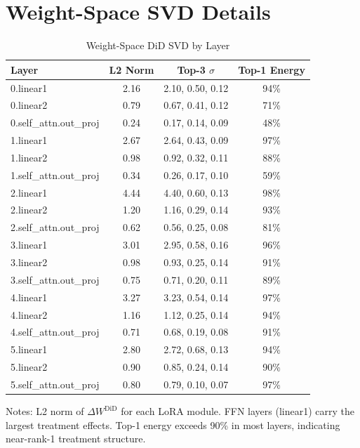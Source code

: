 \documentclass[12pt]{article}
\begin{document}
\section{Weight-Space SVD Details}
\label{app:svd}

\begin{table}[H]
\centering
\caption{Weight-Space DiD SVD by Layer}
\label{tab:svd}
\begin{threeparttable}
\begin{tabular}{lccc}
\toprule
Layer & L2 Norm & Top-3 $\sigma$ & Top-1 Energy \\
\midrule
0.linear1 & 2.16 & 2.10, 0.50, 0.12 & 94\% \\
0.linear2 & 0.79 & 0.67, 0.41, 0.12 & 71\% \\
0.self\_attn.out\_proj & 0.24 & 0.17, 0.14, 0.09 & 48\% \\
\addlinespace
1.linear1 & 2.67 & 2.64, 0.43, 0.09 & 97\% \\
1.linear2 & 0.98 & 0.92, 0.32, 0.11 & 88\% \\
1.self\_attn.out\_proj & 0.34 & 0.26, 0.17, 0.10 & 59\% \\
\addlinespace
2.linear1 & 4.44 & 4.40, 0.60, 0.13 & 98\% \\
2.linear2 & 1.20 & 1.16, 0.29, 0.14 & 93\% \\
2.self\_attn.out\_proj & 0.62 & 0.56, 0.25, 0.08 & 81\% \\
\addlinespace
3.linear1 & 3.01 & 2.95, 0.58, 0.16 & 96\% \\
3.linear2 & 0.98 & 0.93, 0.25, 0.14 & 91\% \\
3.self\_attn.out\_proj & 0.75 & 0.71, 0.20, 0.11 & 89\% \\
\addlinespace
4.linear1 & 3.27 & 3.23, 0.54, 0.14 & 97\% \\
4.linear2 & 1.16 & 1.12, 0.25, 0.14 & 94\% \\
4.self\_attn.out\_proj & 0.71 & 0.68, 0.19, 0.08 & 91\% \\
\addlinespace
5.linear1 & 2.80 & 2.72, 0.68, 0.13 & 94\% \\
5.linear2 & 0.90 & 0.85, 0.24, 0.14 & 90\% \\
5.self\_attn.out\_proj & 0.80 & 0.79, 0.10, 0.07 & 97\% \\
\bottomrule
\end{tabular}
\begin{tablenotes}[flushleft]
\small
\item Notes: L2 norm of $\Delta W^{\text{DiD}}$ for each LoRA module. FFN layers (linear1) carry the largest treatment effects. Top-1 energy exceeds 90\% in most layers, indicating near-rank-1 treatment structure.
\end{tablenotes}
\end{threeparttable}
\end{table}
\end{document}
